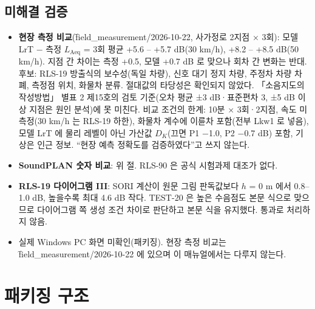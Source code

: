 \documentclass[10.5pt,a4paper]{article}
\begin{document}
\subsection{미해결 검증}
\begin{itemize}
\item \textbf{현장 측정 비교}(\f{field\_measurement/2026-10-22}, 사가정로 2지점 × 3회): 모델 LrT − 측정 $L_\mathrm{Aeq}$ = 3회 평균 +5.6 – +5.7 dB(30 km/h), +8.2 – +8.5 dB(50 km/h). 지점 간 차이는 측정 +0.5, 모델 +0.7 dB 로 맞으나 회차 간 변화는 반대. 후보: RLS-19 방출식의 보수성(독일 차량), 신호 대기 정지 차량, 주정차 차량 차폐, 측정점 위치, 화물차 분류. 절대값의 타당성은 확인되지 않았다. 「소음지도의 작성방법」 별표 2 제15호의 검토 기준(오차 평균 ±3 dB·표준편차 3, ±5 dB 이상 지점은 원인 분석)에 못 미친다. 비교 조건의 한계: 10분 × 3회·2지점, 속도 미측정(30 km/h 는 RLS-19 하한), 화물차 계수에 이륜차 포함(전부 Lkw1 로 넣음), 모델 LrT 에 물리 레벨이 아닌 가산값 $D_K$(끄면 P1 −1.0, P2 −0.7 dB) 포함, 기상은 인근 정보. ``현장 예측 정확도를 검증하였다''고 쓰지 않는다.
\item \textbf{SoundPLAN 숫자 비교}: 위 절. RLS-90 은 공식 시험과제 대조가 없다.
\item \textbf{RLS-19 다이어그램 III}: SORI 계산이 원문 그림 판독값보다 $h$ = 0 m 에서 0.8–1.0 dB, 높을수록 최대 4.6 dB 작다. TEST-20 은 높은 수음점도 본문 식으로 맞으므로 다이어그램 쪽 생성 조건 차이로 판단하고 본문 식을 유지했다. 통과로 처리하지 않음.
\item 실제 Windows PC 화면 미확인(패키징). 현장 측정 비교는 \f{field\_measurement/2026-10-22} 에 있으며 이 매뉴얼에서는 다루지 않는다.
\end{itemize}

\section{패키징 구조}
\end{document}
